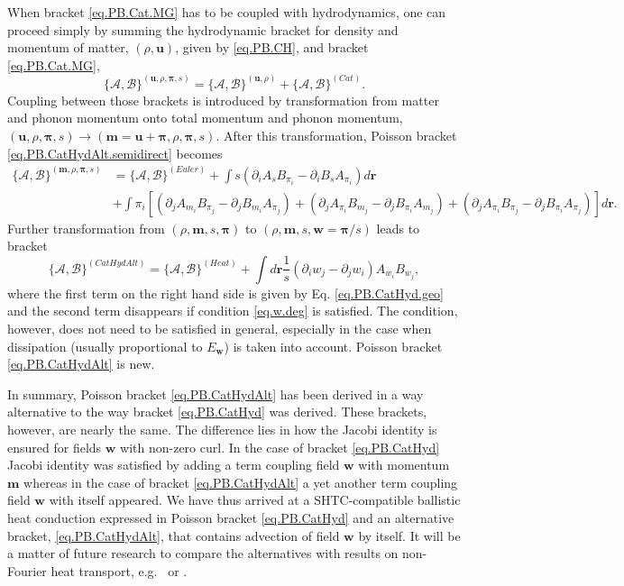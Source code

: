 \documentclass[twoside]{article}
\newcommand{\rr}{{\boldsymbol{r}}}
\newcommand{\ww}{{\boldsymbol{w}}}
\newcommand{\mm}{{\boldsymbol{m}}}
\newcommand{\uu}{{\boldsymbol{u}}}
\newcommand{\ppi}{\boldsymbol{\pi}}
\newcommand{\ted}{E} %
\newcommand{\AF}{\mathscr{A}}
\newcommand{\BF}{\mathscr{B}}
\newcommand{\pd}{\partial}
\begin{document}
When bracket \eqref{eq.PB.Cat.MG} has to be coupled with hydrodynamics, 
one can proceed simply by summing the hydrodynamic bracket for density and 
momentum of matter, $(\rho, \uu)$, given by \eqref{eq.PB.CH}, and bracket 
\eqref{eq.PB.Cat.MG}, 
\begin{equation}\label{eq.PB.CatHydAlt.semidirect}
\{\AF,\BF\}^{(\uu,\rho,\ppi,s)} = \{\AF,\BF\}^{(\uu,\rho)} + 
\{\AF,\BF\}^{(Cat)}.
\end{equation}
Coupling between those brackets is introduced by transformation from matter and 
phonon momentum onto total momentum and phonon momentum, $(\uu,\rho,\ppi,s) 
\rightarrow (\mm = \uu+\ppi, \rho,\ppi, s)$. After this transformation,
Poisson bracket \eqref{eq.PB.CatHydAlt.semidirect} becomes
\begin{align}
\{\AF,\BF\}^{(\mm,\rho,\ppi,s)} &= \{\AF,\BF\}^{(Euler)} + \int s 
\left(\pd_i A_s B_{\pi_i}-\pd_i B_s A_{\pi_i}\right) d\rr \nonumber\\
&+\int \pi_i \left[\left(\pd_j A_{m_i} B_{\pi_j}-\pd_j B_{m_i} A_{\pi_j}\right) 
+\left(\pd_j A_{\pi_i}B_{m_j}-\pd_j B_{\pi_i}A_{m_j}\right) 
+\left(\pd_j A_{\pi_i}B_{\pi_j}-\pd_j B_{\pi_i}A_{\pi_j}\right)\right]d\rr.
\end{align}
Further transformation from $(\rho,\mm,s,\ppi)$ to $(\rho,\mm,s,\ww=\ppi/s)$ 
leads to bracket
\begin{equation}\label{eq.PB.CatHydAlt}
\{\AF,\BF\}^{(CatHydAlt)} = \{\AF,\BF\}^{(Heat)} + \int d\rr 
\frac{1}{s}(\partial_i w_j-\partial_j w_i) 
A_{w_i}B_{w_j},
\end{equation}
where the first term on the right hand side is given by Eq. 
\eqref{eq.PB.CatHyd.geo} and the second term disappears if condition 
\eqref{eq.w.deg} is satisfied. The condition, however, does not need to be 
satisfied in general, especially in the case when dissipation (usually 
proportional to $\ted_{\ww}$) is taken into account. Poisson bracket \eqref{eq.PB.CatHydAlt} is new.

In summary, Poisson bracket \eqref{eq.PB.CatHydAlt} has been derived in a way 
alternative to the way bracket \eqref{eq.PB.CatHyd} was derived. These 
brackets, 
however, are nearly the same. The difference lies in how the Jacobi identity is 
ensured for fields $\ww$ with non-zero curl. In the case of bracket 
\eqref{eq.PB.CatHyd} Jacobi identity was satisfied by adding a term coupling 
field $\ww$ with momentum $ \mm $ whereas in the case of bracket 
\eqref{eq.PB.CatHydAlt} a yet another term coupling field $\ww$ with itself 
appeared. We have thus arrived at a 
SHTC-compatible ballistic heat conduction expressed in Poisson bracket 
\eqref{eq.PB.CatHyd} and an alternative bracket, \eqref{eq.PB.CatHydAlt}, that 
contains advection of field $\ww$ by itself. It will be a matter of future 
research to compare the alternatives with results on non-Fourier heat 
transport, 
e.g.~\cite{Van2017a} or \cite{Van-book}.
\end{document}
